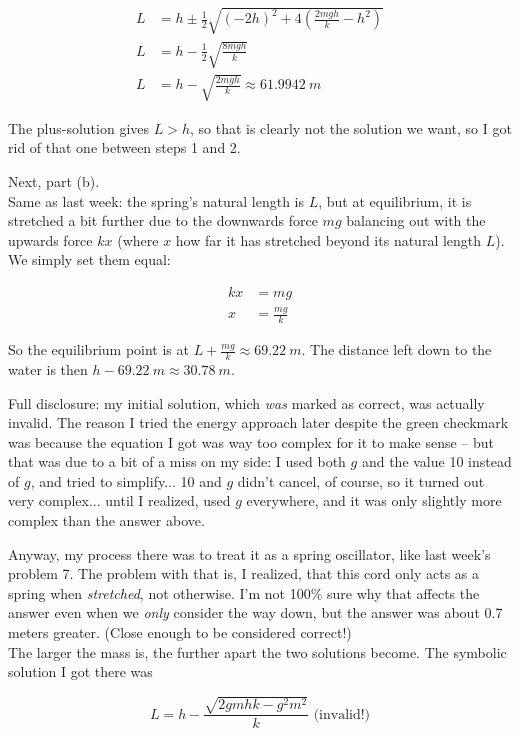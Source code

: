 \documentclass[12pt,a4paper]{report}
\begin{document}
\begin{align}
L &= h \pm \frac{1}{2} \sqrt{(-2h)^2 + 4\left(\frac{2 m g h}{k} - h^2\right)}\\
L &= h - \frac{1}{2} \sqrt{\frac{8 m g h}{k}}\\
L &= h - \sqrt{\frac{2 m g h}{k}} \approx \SI{61.9942}{m}
\end{align}

The plus-solution gives $L > h$, so that is clearly not the solution we want, so I got rid of that one between steps 1 and 2.

Next, part (b).\\
Same as last week: the spring's natural length is $L$, but at equilibrium, it is stretched a bit further due to the downwards force $m g$ balancing out with the upwards force $k x$ (where $x$ how far it has stretched beyond its natural length $L$). We simply set them equal:

\begin{align}
k x &= m g\\
x   &= \frac{m g}{k}
\end{align}

So the equilibrium point is at $L + \frac{m g}{k} \approx \SI{69.22}{m}$. The distance left down to the water is then $h - \SI{69.22}{m} \approx \SI{30.78}{m}$.

Full disclosure: my initial solution, which \emph{was} marked as correct, was actually invalid. The reason I tried the energy approach later despite the green checkmark was because the equation I got was way too complex for it to make sense -- but that was due to a bit of a miss on my side: I used both $g$ and the value 10 instead of $g$, and tried to simplify... 10 and $g$ didn't cancel, of course, so it turned out very complex... until I realized, used $g$ everywhere, and it was only slightly more complex than the answer above.

Anyway, my process there was to treat it as a spring oscillator, like last week's problem 7. The problem with that is, I realized, that this cord only acts as a spring when \emph{stretched}, not otherwise. I'm not 100\% sure why that affects the answer even when we \emph{only} consider the way down, but the answer was about 0.7 meters greater. (Close enough to be considered correct!)\\
The larger the mass is, the further apart the two solutions become. The symbolic solution I got there was

\begin{equation}
L = h - \frac{\sqrt{2 g m h k - g^2 m^2}}{k} \text{ (invalid!)}
\end{equation}
\end{document}
